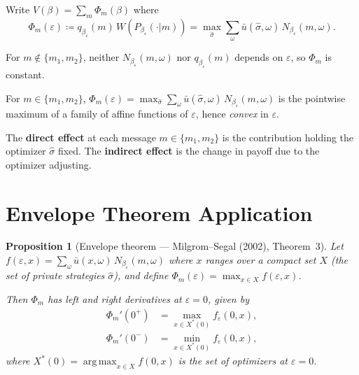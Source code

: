 \documentclass[12pt]{article}
\newtheorem{proposition}[theorem]{Proposition}
\newcommand{\argmax}{\operatorname{arg\,max}}
\begin{document}
Write $V(\beta) = \sum_m \Phi_m(\beta)$ where
\[
\Phi_m(\varepsilon) \coloneqq q_{\beta_\varepsilon}(m)\, W\!\left(P_{\beta_\varepsilon}(\cdot|m)\right)
= \max_{\hat\sigma} \sum_\omega \bar{u}(\hat\sigma,\omega)\, N_{\beta_\varepsilon}(m,\omega).
\]

For $m \notin \{m_1, m_2\}$, neither $N_{\beta_\varepsilon}(m,\omega)$ nor $q_{\beta_\varepsilon}(m)$ depends on $\varepsilon$, so $\Phi_m$ is constant.

For $m \in \{m_1, m_2\}$, $\Phi_m(\varepsilon) = \max_{\hat\sigma} \sum_\omega \bar{u}(\hat\sigma,\omega)\, N_{\beta_\varepsilon}(m,\omega)$ is the pointwise maximum of a family of affine functions of $\varepsilon$, hence \emph{convex} in $\varepsilon$.

The \textbf{direct effect} at each message $m \in \{m_1,m_2\}$ is the contribution holding the optimizer $\hat\sigma$ fixed. The \textbf{indirect effect} is the change in payoff due to the optimizer adjusting.

\section{Envelope Theorem Application}
\label{sec:envelope}

\begin{proposition}[Envelope theorem --- Milgrom--Segal (2002), Theorem~3]
\label{prop:envelope}
Let $f(\varepsilon, x) = \sum_\omega \bar{u}(x, \omega)\, N_{\beta_\varepsilon}(m, \omega)$ where $x$ ranges over a compact set $X$ (the set of private strategies $\hat\sigma$), and define $\Phi_m(\varepsilon) = \max_{x \in X} f(\varepsilon, x)$.

Then $\Phi_m$ has left and right derivatives at $\varepsilon = 0$, given by
\begin{align}
\Phi_m'(0^+) &= \max_{x \in X^*(0)} f_\varepsilon(0, x), \label{eq:env_right}\\
\Phi_m'(0^-) &= \min_{x \in X^*(0)} f_\varepsilon(0, x), \label{eq:env_left}
\end{align}
where $X^*(0) = \argmax_{x \in X} f(0,x)$ is the set of optimizers at $\varepsilon = 0$.
\end{proposition}
\end{document}
